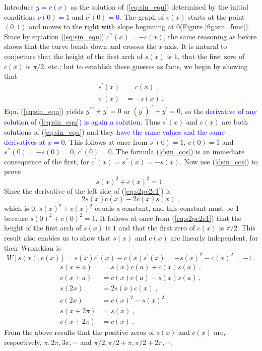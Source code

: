 \documentclass[12pt,a4paper]{article}
\begin{document}
Introduce \textcolor{blue}{$y = c(x)$} as the solution of (\ref{eq:sin_equ}) determined by the initial conditions \textcolor{blue}{$c(0) = 1$} and \textcolor{blue}{$c^\prime(0) = 0$}. The graph of $c(x)$ starts at the point $(0, 1)$ and moves to the right with slope beginning at $0$(Figure \ref{fig:sin_func}). Since by equation (\ref{eq:sin_equ}) $c^{\prime \prime}(x) = -c(x)$, the same reasoning as before shows that the curve bends down and crosses the $x$-axis. It is natural to conjecture that the height of the first arch of $s(x)$ is $1$, that the first zero of $c(x)$ is $\pi/2$, etc.; but to establish these guesses as facts, we begin by showing that
\begin{align}
s^\prime(x) &= c(x) ~, \\
c^\prime(x) &= -s(x) ~.
\label{dsin_cos}
\end{align}
Equ. (\ref{eq:sin_equ}) yields $y^{\prime \prime \prime}+ y^{\prime} = 0$ or $(y^{\prime })^{\prime \prime}+y^{\prime} = 0$, so the \textcolor{blue}{derivative of any solution of (\ref{eq:sin_equ}) is again a solution}. Thus $s^\prime(x)$ and $c(x)$ are both solutions of (\ref{eq:sin_equ}) and they \textcolor{blue}{have the same values and the same derivatives at $x = 0$}. This follows at once from $s^\prime(0) = 1$, $c(0) = 1$ and $s^{\prime \prime}(0) = -s(0) = 0$, $c^{\prime }(0) = 0$. The formula (\ref{dsin_cos}) is an immediate consequence of the first, for $c^{\prime}(x) = s^{\prime\prime}(x) = -s(x)$. Now use (\ref{dsin_cos}) to prove
\begin{equation}
s(x)^2 +c(x)^2 = 1 ~.
\label{eq:s2pc2e1}
\end{equation}
Since the derivative of the left side of (\ref{eq:s2pc2e1}) is
\begin{equation}
2 s(x) c(x) - 2c(x) s(x) ~,
\end{equation}
which is $0$. $s(x)^2 +c(x)^2$ equals a constant, and this constant must be $1$ because $s(0)^2 +c(0)^2 = 1$. It follows at once from (\ref{eq:s2pc2e1}) that the height of the first arch of $s(x)$ is $1$ and that the first zero of $c(x)$ is $\pi/2$. This result also enables us to show that $s(x)$ and $c(x)$ are linearly independent, for their Wronskian is
\begin{equation*}
W[s(x), c(x)] = s(x) c^\prime(x) - c(x) s^\prime(x) = -s(x)^2 -c(x)^2 = -1 ~.
\end{equation*}
\begin{align}
s(x+a) &= s(x)c(a) +c(x)s(a) ~, \\
c(x+a) &= c(x)c(a) -s(x)s(a) ~, \\
s(2x) &= 2s(x) c(x) ~, \\
c(2x) &= c(x)^2 -s(x)^2 ~, \\
s(x+2\pi) &= s(x) ~, \\
c(x+2\pi) &= c(x) ~.
\end{align}
From the above results that the positive zeros of $s(x)$ and $c(x)$ are, respectively, $\pi, 2\pi, 3\pi, \cdots$ and $\pi/2, \pi/2 + \pi, \pi/2 + 2\pi, \cdots$.
\end{document}
